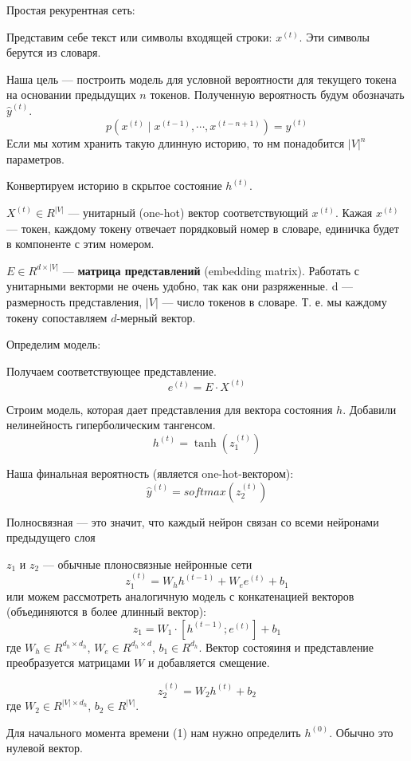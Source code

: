 Простая рекурентная сеть:

Представим себе текст или символы входящей строки: $x^{(t)}$. Эти символы
берутся из словаря.

Наша цель --- построить модель для условной вероятности для текущего токена на
основании предыдущих $n$ токенов. Полученную вероятность будум обозначать $\hat
y^{(t)}$.
\[
    p \left( x^{(t)} \mid x^{(t-1)}, \cdots, x^{(t-n+1)} \right) = \hat y^{(t)}
\]
Если мы хотим хранить такую длинную историю, то нм понадобится $|V|^n$
параметров.

Конвертируем историю в скрытое состояние $h^{(t)}$.

$X^{(t)} \in R^{|V|}$ --- унитарный (one-hot) вектор соответствующий $x^{(t)}$.
Кажая $x^{(t)}$ --- токен, каждому токену отвечает порядковый номер в словаре,
единичка будет в компоненте с этим номером.

$E \in R^{d \times |V|}$ --- \textbf{матрица представлений} (embedding matrix).
Работать с унитарными векторми не очень удобно, так как они разряженные. d ---
размерность представления, $|V|$ --- число токенов в словаре. Т. е. мы каждому
токену сопоставляем $d$-мерный вектор.

Определим модель:

Получаем соответствующее представление.
\[
    e^{(t)} = E \cdot X^{(t)}
\]


Строим модель, которая дает представления для вектора состояния $h$. Добавили
нелинейность гиперболическим тангенсом.
\[
    h^{(t)} = \tanh(z_1^{(t)})
\]


Наша финальная вероятность (является one-hot-вектором):
\[
    \hat y^{(t)} = softmax(z_2^{(t)})
\]

Полносвязная — это значит, что каждый нейрон связан со всеми нейронами
предыдущего слоя

$z_1$ и $z_2$ --- обычные плоносвязные нейронные сети
\[
    z_1^{(t)} = W_h h^{(t-1)} + W_e e^{(t)} + b_1
\]
или можем рассмотреть аналогичную модель с конкатенацией векторов (объединяются в более длинный
вектор):
\[
    z_1 = W_1 \cdot [h^{(t-1)}; e^{(t)}] + b_1
\]
где $W_h \in R^{d_h \times d_h}$, $W_e \in R^{d_h \times d}$, $b_1 \in
R^{d_h}$. Вектор состояиня и представление преобразуется матрицами $W$ и
добавляется смещение.


\[
    z_2^{(t)} = W_2 h^{(t)} + b_2
\] где $W_2 \in R^{|V| \times d_h}$, $b_2 \in R^{|V|}$.

Для начального момента времени (1) нам нужно определить $h^{(0)}$. Обычно это
нулевой вектор.

